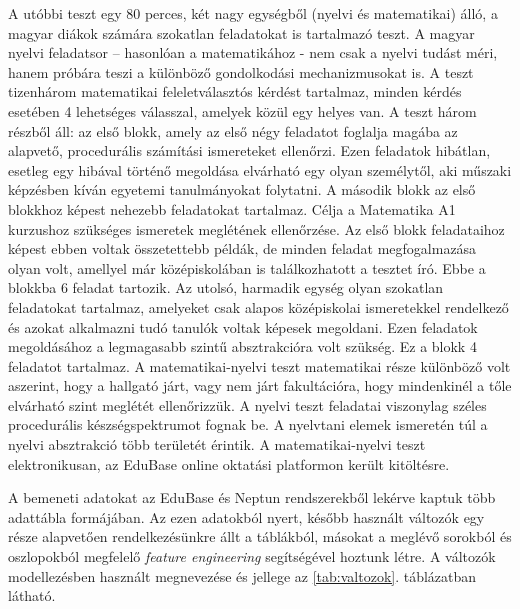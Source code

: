 \documentclass[12pt]{article}
\begin{document}
A utóbbi teszt egy 80 perces, két nagy egységből (nyelvi és matematikai) álló, a magyar diákok számára szokatlan feladatokat is tartalmazó teszt. A magyar nyelvi feladatsor – hasonlóan a matematikához - nem csak a nyelvi tudást méri, hanem próbára teszi a különböző gondolkodási mechanizmusokat is. A teszt tizenhárom matematikai feleletválasztós kérdést tartalmaz, minden kérdés esetében 4 lehetséges válasszal, amelyek közül egy helyes van. A teszt három részből áll: az első blokk, amely az első négy feladatot foglalja magába az alapvető, procedurális számítási ismereteket ellenőrzi. Ezen feladatok hibátlan, esetleg egy hibával történő megoldása elvárható egy olyan személytől, aki műszaki képzésben kíván egyetemi tanulmányokat folytatni. A második blokk az első blokkhoz képest nehezebb feladatokat tartalmaz. Célja a Matematika A1 kurzushoz szükséges ismeretek meglétének ellenőrzése. Az első blokk feladataihoz képest ebben voltak összetettebb példák, de minden feladat megfogalmazása olyan volt, amellyel már középiskolában is találkozhatott a tesztet író. Ebbe a blokkba 6 feladat tartozik. Az utolsó, harmadik egység olyan szokatlan feladatokat tartalmaz, amelyeket csak alapos középiskolai ismeretekkel rendelkező és azokat alkalmazni tudó tanulók voltak képesek megoldani. Ezen feladatok megoldásához a legmagasabb szintű absztrakcióra volt szükség. Ez a blokk 4 feladatot tartalmaz. A matematikai-nyelvi teszt matematikai része különböző volt aszerint, hogy a hallgató járt, vagy nem járt fakultációra, hogy mindenkinél a tőle elvárható szint meglétét ellenőrizzük. A nyelvi teszt feladatai viszonylag széles procedurális készségspektrumot fognak be. A nyelvtani elemek ismeretén túl a nyelvi absztrakció több területét érintik. A matematikai-nyelvi teszt elektronikusan, az EduBase online oktatási platformon került kitöltésre.

A bemeneti adatokat az EduBase és Neptun rendszerekből lekérve kaptuk több adattábla formájában. Az ezen adatokból nyert, később használt változók egy része alapvetően rendelkezésünkre állt a táblákból, másokat a meglévő sorokból és oszlopokból megfelelő \textit{feature engineering} segítségével hoztunk létre. A változók modellezésben használt megnevezése és jellege az \ref{tab:valtozok}. táblázatban látható.
\end{document}

